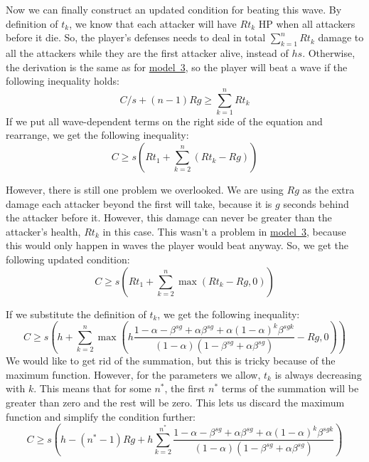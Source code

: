 Now we can finally construct an updated condition for beating this wave.
By definition of $t_k$, we know that each attacker will have $Rt_k$ HP when all attackers before it die.
So, the player's defenses needs to deal in total $\sum_{k=1}^{n} Rt_k$ damage to all the attackers while they are the first attacker alive, instead of $hs$.
Otherwise, the derivation is the same as for \hyperref[sec:analysis-waves-finite]{model~3}, so the player will beat a wave if the following inequality holds:
\begin{equation}
    C/s + (n-1)Rg \geq \sum_{k=1}^{n} Rt_k
\end{equation}
If we put all wave-dependent terms on the right side of the equation and rearrange, we get the following inequality:
\begin{equation}
    C \geq s\left(Rt_1 + \sum_{k=2}^{n} (Rt_k - Rg)\right)
\end{equation}

However, there is still one problem we overlooked.
We are using $Rg$ as the extra damage each attacker beyond the first will take, because it is $g$ seconds behind the attacker before it.
However, this damage can never be greater than the attacker's health, $Rt_k$ in this case.
This wasn't a problem in \hyperref[sec:analysis-waves-finite]{model~3}, because this would only happen in waves the player would beat anyway.
So, we get the following updated condition:
\begin{equation}
    C \geq s\left(Rt_1 + \sum_{k=2}^{n} \max(Rt_k - Rg, 0)\right)
\end{equation}

If we substitute the definition of $t_k$, we get the following inequality:
\begin{equation}
    C \geq s\left(h + \sum_{k=2}^{n} \max \left(
        h\frac{
                1-\alpha-\beta^{sg}+\alpha\beta^{sg}+\alpha(1-\alpha)^k\beta^{sgk}
            }{
                (1-\alpha)(1-\beta^{sg}+\alpha\beta^{sg})
            }
        - Rg, 0
        \right)\right)
\end{equation}
We would like to get rid of the summation, but this is tricky because of the maximum function.
However, for the parameters we allow, $t_k$ is always decreasing with $k$.
This means that for some $n^*$, the first $n^*$ terms of the summation will be greater than zero and the rest will be zero.
This lets us discard the maximum function and simplify the condition further:
\begin{equation}
    C \geq s\left(h - (n^*-1)Rg + h\sum_{k=2}^{n^*} \frac{
        1-\alpha-\beta^{sg}+\alpha\beta^{sg}+\alpha(1-\alpha)^k\beta^{sgk}
    }{
        (1-\alpha)(1-\beta^{sg}+\alpha\beta^{sg})
    }
    \right)
\end{equation}

